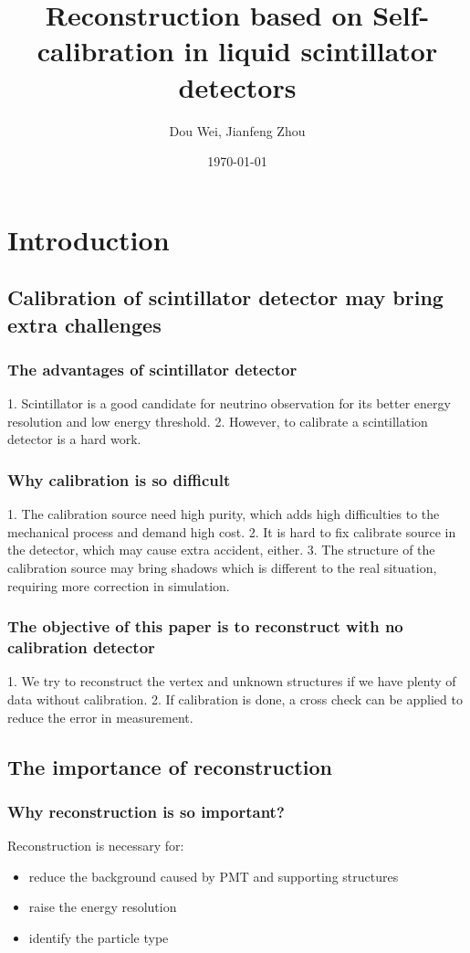\documentclass{article}
\title{Reconstruction based on Self-calibration in liquid scintillator detectors}
\author{Dou Wei, Jianfeng Zhou}
\date{\today}
\begin{document}
\maketitle
\abstract{}
\section{Introduction}
\subsection{Calibration of scintillator detector may bring extra challenges}
\subsubsection{The advantages of scintillator detector}
1. Scintillator is a good candidate for neutrino observation for its better energy resolution and low energy threshold.
2. However, to calibrate a scintillation detector is a hard work.
\subsubsection{Why calibration is so difficult}
1. The calibration source need high purity, which adds high difficulties to the mechanical process and demand high cost. 
2. It is hard to fix calibrate source in the detector, which may cause extra accident, either. 
3. The structure of the calibration source may bring shadows which is different to the real situation, requiring more correction in simulation.
\subsubsection{The objective of this paper is to reconstruct with no calibration detector}
1.  We try to reconstruct the vertex and unknown structures if we have plenty of data without calibration.
2.  If calibration is done, a cross check can be applied to reduce the error in measurement. 
\subsection{The importance of reconstruction}
\subsubsection{Why reconstruction is so important?}
Reconstruction is necessary for:
    \begin{itemize}
	\item reduce the background caused by PMT and supporting structures
	\item raise the energy resolution
        \item identify the particle type
    \end{itemize}
\end{document}
